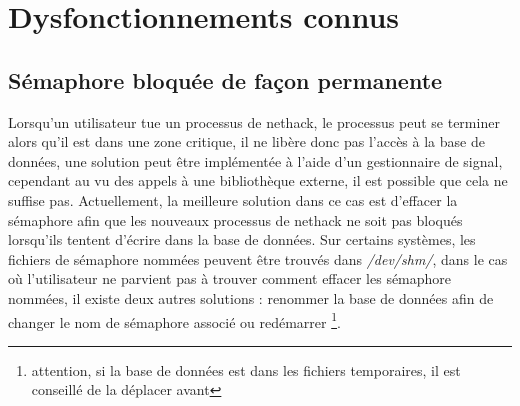 \documentclass[10pt,a4paper]{report}
\begin{document}
\chapter{Dysfonctionnements connus}
\section{Sémaphore bloquée de façon permanente}
Lorsqu'un utilisateur tue un processus de nethack, le processus peut se terminer alors
qu'il est dans une zone critique, il ne libère donc pas l'accès à la base de données,
une solution peut être implémentée à l'aide d'un gestionnaire de signal, cependant au vu
des appels à une bibliothèque externe, il est possible que cela ne suffise pas.
Actuellement, la meilleure solution dans ce cas est d'effacer la sémaphore afin que les
nouveaux processus de nethack ne soit pas bloqués lorsqu'ils tentent d'écrire dans la
base de données. Sur certains systèmes, les fichiers de sémaphore nommées peuvent être
trouvés dans \emph{/dev/shm/}, dans le cas où l'utilisateur ne parvient pas à trouver
comment effacer les sémaphore nommées, il existe deux autres solutions : renommer la
base de données afin de changer le nom de sémaphore associé ou redémarrer
\footnote{attention, si la base de données est dans les fichiers temporaires, il est
conseillé de la déplacer avant}.
\end{document}
